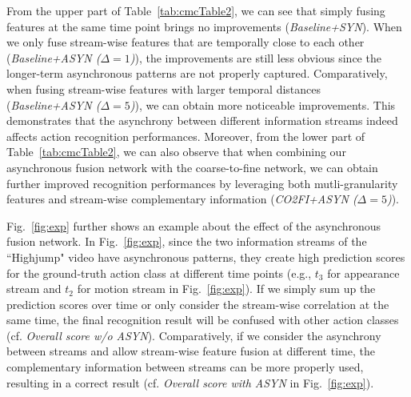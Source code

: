 \documentclass[letterpaper]{article} %
\begin{document}
{%

From the upper part of Table~\ref{tab:cmcTable2}, we can see that simply fusing features at the same time point brings no improvements (\emph{Baseline+SYN}). When we only fuse stream-wise features that are temporally close to each other (\emph{Baseline+ASYN ($\Delta=1$)}), the improvements are still less obvious since the longer-term asynchronous patterns are not properly captured. Comparatively, when fusing stream-wise features with larger temporal distances (\emph{Baseline+ASYN ($\Delta=5$)}), we can obtain more noticeable improvements. This demonstrates that the asynchrony between different information streams indeed affects action recognition performances. Moreover, from the lower part of Table~\ref{tab:cmcTable2}, we can also observe that when combining our asynchronous fusion network with the coarse-to-fine network, we can obtain further improved recognition performances by leveraging both mutli-granularity features and stream-wise complementary information (\emph{CO2FI+ASYN ($\Delta=5$)}).

Fig.~\ref{fig:exp} further shows an example about the effect of the asynchronous fusion network. In Fig.~\ref{fig:exp}, since the two information streams of the ``Highjump" video have asynchronous patterns, they create high prediction scores for the ground-truth action class at different time points (e.g., $t_3$ for appearance stream and $t_2$  for motion stream in Fig.~\ref{fig:exp}). If we simply sum up the prediction scores over time or only consider the stream-wise correlation at the same time, the final recognition result will be confused with other action classes (cf. \emph{Overall score w/o ASYN}). Comparatively, if we consider the asynchrony between streams and allow stream-wise feature fusion at different time, the complementary information between streams can be more properly used, resulting in a correct result (cf. \emph{Overall score with ASYN} in Fig.~\ref{fig:exp}).




}
\end{document}
